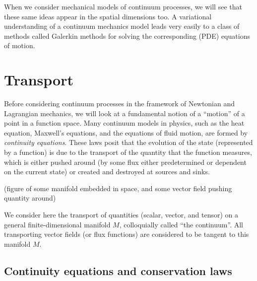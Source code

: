 \documentclass[11pt,a4paper]{memoir}
\begin{document}
When we consider mechanical models of continuum processes, we will see that these same ideas appear in the spatial dimensions too.
A variational understanding of a continuum mechanics model leads very easily to a class of methods called Galerkin methods for solving
the corresponding (PDE) equations of motion.


\section{Transport} %

Before considering continuum processes in the framework of Newtonian and Lagrangian mechanics, we will look at a fundamental notion of a ``motion''
of a point in a function space. Many continuum models in physics, such as the heat equation,
Maxwell's equations, and the equations of fluid motion, are formed by \textit{continuity equations}. These laws posit that the
evolution of the state (represented by a function) is
due to the transport of the quantity that the function measures, which is either pushed around (by some flux either predetermined or dependent on the current state)
or created and destroyed at sources and sinks.

\vskip 0.2in
(figure of some manifold embedded in space, and some vector field pushing quantity around)
\vskip 0.2in

We consider here the transport of quantities (scalar, vector, and tensor) on a general finite-dimensional manifold $M$,
colloquially called ``the continuum''. All transporting vector fields (or flux functions) are considered to be tangent to this manifold $M$.

\subsection{Continuity equations and conservation laws}
\end{document}

